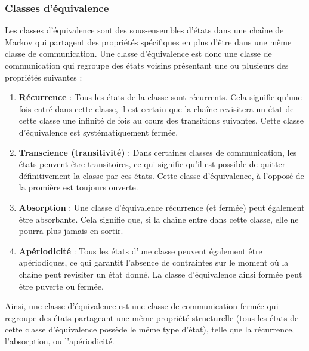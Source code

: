 \documentclass{article}
\begin{document}

\subsubsection{Classes d'équivalence}

Les classes d'équivalence sont des sous-ensembles d'états dans une chaîne de Markov qui partagent des propriétés spécifiques en plus d'être dans une même classe de communication. Une classe d'équivalence est donc une classe de communication qui regroupe des états voisins présentant une ou plusieurs des propriétés suivantes :

\begin{enumerate}
\item \textbf{Récurrence} : Tous les états de la classe sont récurrents. Cela signifie qu'une fois entré dans cette classe, il est certain que la chaîne revisitera un état de cette classe une infinité de fois au cours des transitions suivantes. Cette classe d'équivalence est systématiquement fermée.
\item \textbf{Transcience (transitivité)} : Dans certaines classes de communication, les états peuvent être transitoires, ce qui signifie qu'il est possible de quitter définitivement la classe par ces états. Cette classe d'équivalence, à l'opposé de la promière est toujours ouverte.
\item \textbf{Absorption} : Une classe d'équivalence récurrence (et fermée) peut également être absorbante. Cela signifie que, si la chaîne entre dans cette classe, elle ne pourra plus jamais en sortir.
\item \textbf{Apériodicité} : Tous les états d'une classe peuvent également être apériodiques, ce qui garantit l'absence de contraintes sur le moment où la chaîne peut revisiter un état donné. La classe d'équivalence ainsi formée peut être puverte ou fermée. \\
\end{enumerate}

Ainsi, une classe d'équivalence est une classe de communication fermée qui regroupe des états partageant une même propriété structurelle (tous les états de cette classe d'équivalence possède le même type d'état), telle que la récurrence, l'absorption, ou l'apériodicité. \\
\end{document}
